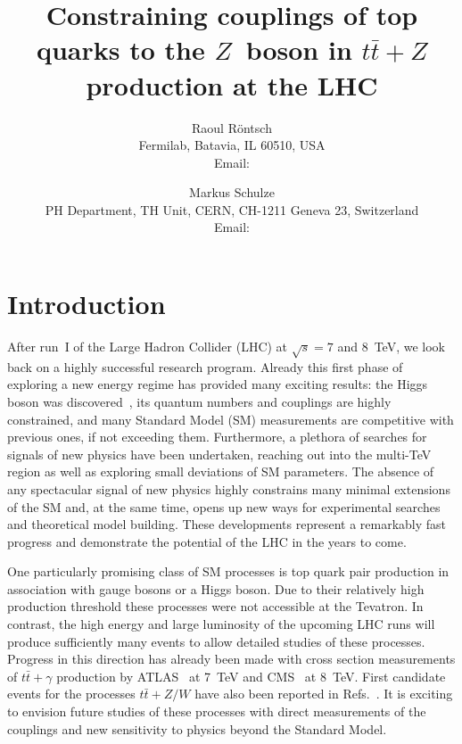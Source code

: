 \documentclass[preprint]{JHEP3}
\title{Constraining couplings of top quarks to the $Z$~boson in $t\bar{t}+Z$ production at the LHC}
\author{Raoul R\"ontsch \\ Fermilab, Batavia, IL 60510, USA \\
  Email: \email{rontsch@fnal.gov} }
\author{Markus Schulze \\ PH Department, TH Unit, CERN, CH-1211 Geneva 23, Switzerland \\
  Email: \email{markus.schulze@cern.ch} }
\def\ttb{t\bar{t}}
\begin{document}

\section{Introduction}
After run~I of the Large Hadron Collider (LHC) at $\sqrt{s}=7$ and 8~TeV, we look back on a highly successful research program.
Already this first phase of exploring a new energy regime has provided many exciting results: 
the Higgs boson was discovered~\cite{Chatrchyan:2012ufa,Aad:2012tfa}, its quantum numbers and couplings are highly constrained,
and many Standard Model (SM) measurements are competitive with previous ones, if not exceeding them.
Furthermore, a plethora of searches for signals of new physics have been undertaken, reaching out into the multi-TeV region as well as
exploring small deviations of SM parameters. 
The absence of any spectacular signal of new physics highly constrains many minimal extensions of the SM and, at the same time, 
opens up new ways for %
experimental searches and theoretical model building.
These developments represent a remarkably fast progress and demonstrate the potential of the LHC in the years to come.

One particularly promising class of SM processes is top quark pair production in association with gauge bosons or a Higgs boson.
Due to their relatively high production threshold these processes were not accessible at the Tevatron. 
In contrast, the high energy and large luminosity of the upcoming LHC runs will produce sufficiently many events to allow detailed studies of these processes.
Progress in this direction has already been made with cross section measurements of $\ttb+\gamma$ production by ATLAS~\cite{ATLAS:2011nka} at 7~TeV  
and CMS~\cite{CMS:2014wma} at 8~TeV. First candidate events for the processes $\ttb+Z/W$  have also been reported in Refs.~\cite{ATLAS-CONF-2012-126,Chatrchyan:2013qca}.
It is exciting to envision future studies of these processes with direct measurements of the couplings and new sensitivity to physics beyond the Standard Model. 
\end{document}

